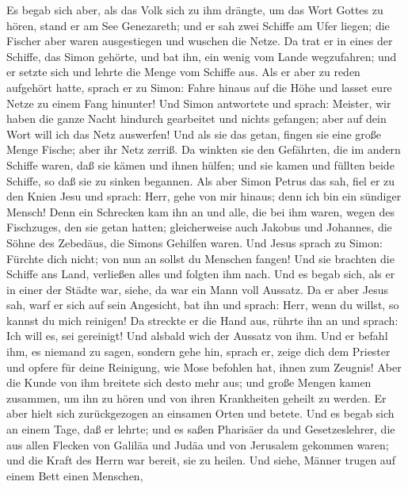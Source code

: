  Es begab sich aber, als das Volk sich zu ihm drängte, um
das Wort Gottes zu hören, stand er am See Genezareth;  und
er sah zwei Schiffe am Ufer liegen; die Fischer aber waren ausgestiegen
und wuschen die Netze.  Da trat er in eines der Schiffe,
das Simon gehörte, und bat ihn, ein wenig vom Lande wegzufahren; und er
setzte sich und lehrte die Menge vom Schiffe aus.  Als er
aber zu reden aufgehört hatte, sprach er zu Simon: Fahre hinaus auf die
Höhe und lasset eure Netze zu einem Fang hinunter!  Und
Simon antwortete und sprach: Meister, wir haben die ganze Nacht hindurch
gearbeitet und nichts gefangen; aber auf dein Wort will ich das Netz
auswerfen!  Und als sie das getan, fingen sie eine große
Menge Fische; aber ihr Netz zerriß.  Da winkten sie den
Gefährten, die im andern Schiffe waren, daß sie kämen und ihnen hülfen;
und sie kamen und füllten beide Schiffe, so daß sie zu sinken begannen.
 Als aber Simon Petrus das sah, fiel er zu den Knien Jesu
und sprach: Herr, gehe von mir hinaus; denn ich bin ein sündiger Mensch!
 Denn ein Schrecken kam ihn an und alle, die bei ihm
waren, wegen des Fischzuges, den sie getan hatten; 
gleicherweise auch Jakobus und Johannes, die Söhne des Zebedäus, die
Simons Gehilfen waren. Und Jesus sprach zu Simon: Fürchte dich nicht;
von nun an sollst du Menschen fangen!  Und sie brachten
die Schiffe ans Land, verließen alles und folgten ihm nach.
 Und es begab sich, als er in einer der Städte war,
siehe, da war ein Mann voll Aussatz. Da er aber Jesus sah, warf er sich
auf sein Angesicht, bat ihn und sprach: Herr, wenn du willst, so kannst
du mich reinigen!  Da streckte er die Hand aus, rührte
ihn an und sprach: Ich will es, sei gereinigt! Und alsbald wich der
Aussatz von ihm.  Und er befahl ihm, es niemand zu sagen,
sondern gehe hin, sprach er, zeige dich dem Priester und opfere für
deine Reinigung, wie Mose befohlen hat, ihnen zum Zeugnis!
 Aber die Kunde von ihm breitete sich desto mehr aus; und
große Mengen kamen zusammen, um ihn zu hören und von ihren Krankheiten
geheilt zu werden.  Er aber hielt sich zurückgezogen an
einsamen Orten und betete.  Und es begab sich an einem
Tage, daß er lehrte; und es saßen Pharisäer da und Gesetzeslehrer, die
aus allen Flecken von Galiläa und Judäa und von Jerusalem gekommen
waren; und die Kraft des Herrn war bereit, sie zu heilen.
 Und siehe, Männer trugen auf einem Bett einen Menschen,
